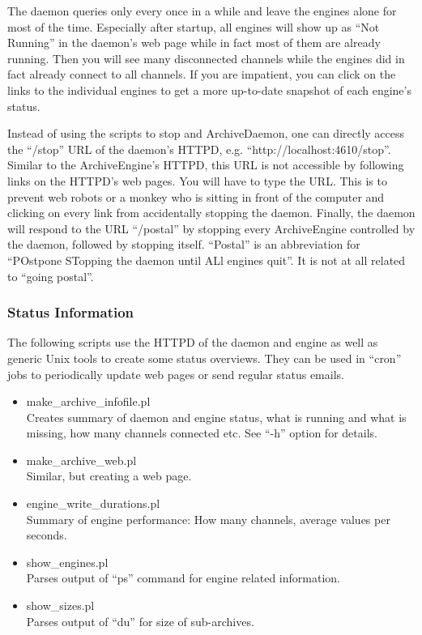 \NOTE The daemon queries only every once in a while and leave the
engines alone for most of the time.
Especially after startup, all engines will show up as ``Not Running''
in the daemon's web page while in fact most of them are already
running. Then you will see many disconnected channels while the
engines did in fact already connect to all channels. 
If you are impatient, you can click on the links to the individual
engines to get a more up-to-date snapshot of each engine's status.

Instead of using the scripts to stop and ArchiveDaemon, one can
directly access the ``/stop'' URL of the daemon's HTTPD,
e.g. ``http://localhost:4610/stop''.  Similar to the ArchiveEngine's
HTTPD, this URL is not accessible by following links on the HTTPD's
web pages. You will have to type the URL. This is to prevent web
robots or a monkey who is sitting in front of the computer and
clicking on every link from accidentally stopping the daemon.
Finally, the daemon will respond to the URL ``/postal'' by stopping
every ArchiveEngine controlled by the daemon, followed by stopping
itself. ``Postal'' is an abbreviation for ``POstpone STopping the
daemon until ALl engines quit''. It is not at all related to ``going
postal''.

\subsubsection{Status Information}
The following scripts use the HTTPD of the daemon and engine
as well as generic Unix tools to create some status overviews.
They can be used in ``cron'' jobs to periodically update
web pages or send regular status emails.

\begin{itemize}
\item make\_archive\_infofile.pl \\
      Creates summary of daemon and engine status,
      what is running and what is missing,
      how many channels connected etc.
      See ``-h'' option for details.
\item make\_archive\_web.pl \\
      Similar, but creating a web page.
\item engine\_write\_durations.pl \\
      Summary of engine performance: How many channels, average values
      per seconds.
\item show\_engines.pl \\
      Parses output of ``ps'' command for engine related information.
\item show\_sizes.pl \\
      Parses output of ``du'' for size of sub-archives.
\end{itemize}

